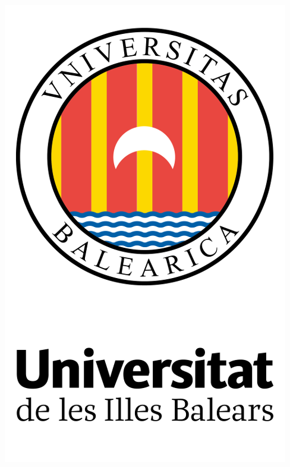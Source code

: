 \documentclass[../main.tex]{subfiles}
\begin{document}
\begin{titlepage}
    \begin{addmargin}[-1cm]{-3cm}
        \large

        \begin{center}
            
            \includegraphics[width=.35\textwidth]{frontbackmatter/figures/uib.png}

        
            \vspace*{.05\textheight}

             \\
            \myYear

            \vspace*{.15\textheight}

            \begingroup
                \spacedallcaps{\myTitle}
                \\ \smallskip
                \textsc{\MakeLowercase{\mySubtitle}}
            \endgroup

            \vfill

            \myName
        \end{center}
    \end{addmargin}
\end{titlepage}
\end{document}
